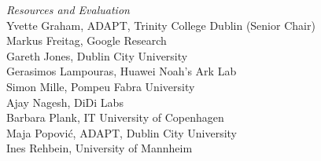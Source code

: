 \emph{Resources and Evaluation} \\
\hspace*{0.2in} Yvette Graham, ADAPT, Trinity College Dublin (Senior Chair)\\
\hspace*{0.2in} Markus Freitag, Google Research\\
\hspace*{0.2in} Gareth Jones, Dublin City University\\
\hspace*{0.2in} Gerasimos Lampouras, Huawei Noah's Ark Lab\\
\hspace*{0.2in} Simon Mille, Pompeu Fabra University\\
\hspace*{0.2in} Ajay Nagesh, DiDi Labs\\
\hspace*{0.2in} Barbara Plank, IT University of Copenhagen\\
\hspace*{0.2in} Maja Popović, ADAPT, Dublin City University\\
\hspace*{0.2in} Ines Rehbein, University of Mannheim\\

